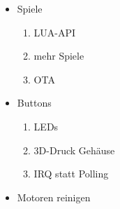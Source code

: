 \documentclass[a4paper]{article}
\begin{document}
  \begin{itemize}
    \item Spiele
    \begin{enumerate}
      \item LUA-API
      \item mehr Spiele
      \item OTA
    \end{enumerate}
    \item Buttons
    \begin{enumerate}
      \item LEDs
      \item 3D-Druck Gehäuse
      \item IRQ statt Polling
    \end{enumerate}
    \item Motoren reinigen
  \end{itemize}
\end{document}
